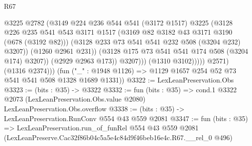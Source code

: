 \begin{lexlean}{R67}
\begin{coremodule}
                              @3225
                              @2782
                              (@3149
                                @224
                                @236
                                @544
                                @541
                                (@3172 @1517)
                                @3225
                                (@3128
                                  @226
                                  @235
                                  @541
                                  @543
                                  @3171
                                  @1517
                                  (@3169 @82 @3182 @43 @3171 @3190 (@678 (@3192 @82)))
                                  (@3128 @233 @73 @541 @541 @232 @508 (@3204 @232) @3207))
                                (@1260 @2961 @231))
                              (@3128 @175 @73 @541 @541 @174 @508 (@3204 @174) @3207))
                            (@2929 @2963 @173))
                          @3207)))
                    (@1310 @3102)))))
            @2571)
          (@1316 @2374)))
      (fun ("_" : @1948 @1126) => @1129 @1657 @254 @52 @73 @541 @541 @508 @1328 @1689 @1331))
@3322 := LexLeanPreservation.Obs
@3323 := (bits : @35) -> @3322
@3332 := fun (bits : @35) =>
  cond.{1} @3322 @2073 (LexLeanPreservation.Obs.value @2080) LexLeanPreservation.Obs.overflow
@3338 := (bits : @35) -> LexLeanPreservation.RunConv @554 @43 @559 @2081
@3347 := fun (bits : @35) =>
  LexLeanPreservation.run_of_funRel
    @554
    @43
    @559
    @2081
    (LexLeanPreserve.Cac32f86b04c5a5e4c84d9f46beb16e4c.R67.__rel_0 @496)
\end{coremodule}
\end{lexlean}
